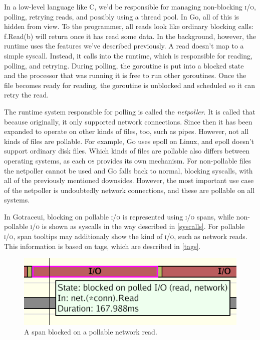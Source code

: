 \documentclass[10pt,letterpaper,oneside,openany,english]{memoir}
\newcommand{\code}[1]{{\ttfamily\mbox{#1}}}
\begin{document}
In a low-level language like C, we'd be responsible for managing non-blocking \textsc{i/o}, polling, retrying reads, and possibly using a thread pool.
In Go, all of this is hidden from view. To the programmer, all reads look like ordinary blocking calls: \code{f.Read(b)} will return once it has read some data.
In the background, however, the runtime uses the features we've described previously.
A read doesn't map to a simple syscall. Instead, it calls into the runtime, which is responsible for reading, polling, and retrying.
During polling, the goroutine is put into a blocked state and the processor that was running it is free to run other goroutines.
Once the file becomes ready for reading, the goroutine is unblocked and scheduled so it can retry the read.

The runtime system responsible for polling is called the \emph{netpoller}. It is called that because originally, it only supported network connections.
Since then it has been expanded to operate on other kinds of files, too, such as pipes.
However, not all kinds of files are pollable. For example, Go uses epoll on Linux, and epoll doesn't support ordinary disk files.
Which kinds of files are pollable also differs between operating systems, as each \textsc{os} provides its own mechanism.
For non-pollable files the netpoller cannot be used and Go falls back to normal, blocking syscalls, with all of the previously mentioned downsides.
However, the most important use case of the netpoller is undoubtedly network connections, and these are pollable on all systems.

In Gotraceui, blocking on pollable \textsc{i/o} is represented using \textsc{i/o} spans, while non-pollable \textsc{i/o} is shown as syscalls in the way described in \cref{syscalls}.
For pollable \textsc{i/o}, span tooltips may additionaly show the kind of \textsc{i/o}, such as network reads. This information is based on tags, which are described in \cref{tags}.

\begin{figure}[h]
  \centering
  \includegraphics[scale=2]{images/screenshots/pollable-io-span.png}
  \caption{A span blocked on a pollable network read.}
\end{figure}
\end{document}

